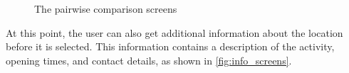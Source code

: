 \documentclass[11pt,a4paper,oneside]{article}
\begin{document}
\begin{figure}[H]
    \centering
    \qquad
    \caption{The pairwise comparison screens }%
    \label{fig:pairwise_comparison_screens}%
\end{figure}

At this point, the user can also get additional information about the location before it is selected. This information contains a description of the activity, opening times, and contact details, as shown in \autoref{fig:info_screens}.
\end{document}
